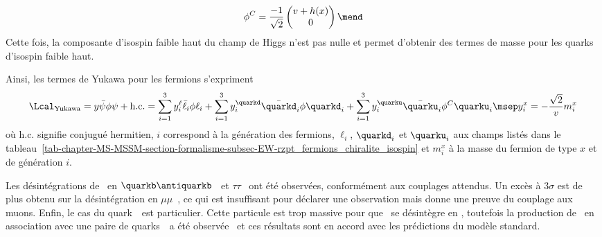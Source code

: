\begin{equation}
\phi^C =
\frac{-1}{\sqrt{2}}
\begin{pmatrix}
v+h(x)\\0
\end{pmatrix}
\mend
\end{equation}
Cette fois, la composante d'isospin faible haut du champ de Higgs n'est pas nulle et permet d'obtenir des termes de masse pour les quarks d'isospin faible haut.
\par Ainsi, les termes de Yukawa pour les fermions s'expriment
\begin{equation}
\Lcal_\text{Yukawa}
=
y \bar{\psi} \phi \psi + \text{h.c.}
=
\sum_{i=1}^3 y_i^\ell \bar{\ell}_i \phi \ell_i
+ \sum_{i=1}^3 y_i^\quarkd \bar{\quarkd}_i \phi \quarkd_i
+ \sum_{i=1}^3 y_i^\quarku \bar{\quarku}_i \phi^C \quarku_i
\msep
y_i^x = -\frac{\sqrt{2}}{v}m_i^x
\label{eq-chapter-MS-MSSM-section-formalisme-subsec-Higgs_mechanism-subsubsec-fermions-Yukawa_couplings}
\end{equation}
où
\og $\text{h.c.}$ \fg{} signifie conjugué hermitien,
$i$ correspond à la génération des fermions,
$\ell_i$, $\quarkd_i$ et $\quarku_i$ aux champs listés dans le tableau~\ref{tab-chapter-MS-MSSM-section-formalisme-subsec-EW-rzpt_fermions_chiralite_isospin}
et
$m_i^x$ à la masse du fermion de type $x$ et de génération $i$.
\par
Les désintégrations de \higgs\
en
$\quarkb\antiquarkb$~\cite{Chatrchyan:2013qga,PhysRevD.89.012003}
et
$\tau\tau$~\cite{Chatrchyan:2014nva,sm_categories}
ont été observées, conformément aux couplages attendus.
Un excès à $3\sigma$
est de plus obtenu sur la désintégration en $\mu\mu$~\cite{CMS-PAS-HIG-19-006},
ce qui est insuffisant pour déclarer une observation mais donne une preuve du couplage aux muons.
Enfin, le cas du quark~\quarkt\ est particulier.
Cette particule est trop massive pour que \higgs\ se désintègre en \quarkt\antiquarkt,
toutefois
la production de \higgs\ en association avec une paire de quarks~\quarkt\ a été observée~\cite{PhysRevLett.120.231801}
et ces résultats sont en accord avec les prédictions du modèle standard.